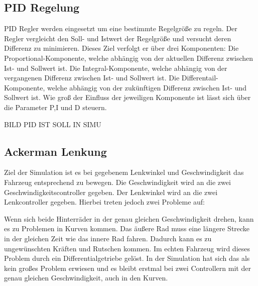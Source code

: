 \subsection{PID Regelung}
PID Regler werden eingesetzt um eine bestimmte Regelgröße zu regeln. 
Der Regler vergleicht den Soll- und Istwert der Regelgröße und versucht deren Differenz zu minimieren.
Dieses Ziel verfolgt er über drei Komponenten: 
Die Proportional-Komponente, welche abhängig von der aktuellen Differenz zwischen Ist- und Sollwert ist.
Die Integral-Komponente, welche abhängig von der vergangenen Differenz zwischen Ist- und Sollwert ist.
Die Differentail-Komponente, welche abhängig von der zukünftigen Differenz zwischen Ist- und Sollwert ist.
Wie groß der Einfluss der jeweiligen Komponente ist lässt sich über die Parameter P,I und D steuern.
\cite{PIDRegler:2020}

BILD PID IST SOLL IN SIMU

\subsection{Ackerman Lenkung}
Ziel der Simulation ist es bei gegebenem Lenkwinkel und Geschwindigkeit das Fahrzeug entsprechend zu bewegen.
Die Geschwindigkeit wird an die zwei Geschwindigkeitscontroller gegeben.
Der Lenkwinkel wird an die zwei Lenkcontroller gegeben.
Hierbei treten jedoch zwei Probleme auf:

Wenn sich beide Hinterräder in der genau gleichen Geschwindigkeit drehen, kann es zu Problemen in Kurven kommen.
Das äußere Rad muss eine längere Strecke in der gleichen Zeit wie das innere Rad fahren. 
Dadurch kann es zu ungewünschten Kräften und Rutschen kommen.
Im echten Fahrzeug wird dieses Problem durch ein Differentialgetriebe gelöst.
In der Simulation hat sich das als kein großes Problem erwiesen und es bleibt erstmal bei zwei Controllern mit der genau gleichen Geschwindigkeit, auch in den Kurven.

